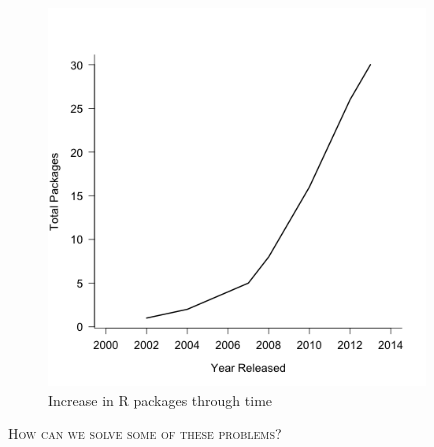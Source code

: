 \documentclass[a4paper,12pt]{article}
\renewcommand{\section}[1]{
  \bigskip
  \begin{center}
  \begin{Large}
  \normalfont\scshape #1
  \medskip
  \end{Large}
  \end{center}
}
\begin{document}
\begin{figure}[h]
\centering
\includegraphics[width = 10cm]{PCMRpackages.png}
\caption{Increase in R packages through time}
\label{PCMRpackages}
\end{figure}

\section{How can we solve some of these problems?}

\end{document}
